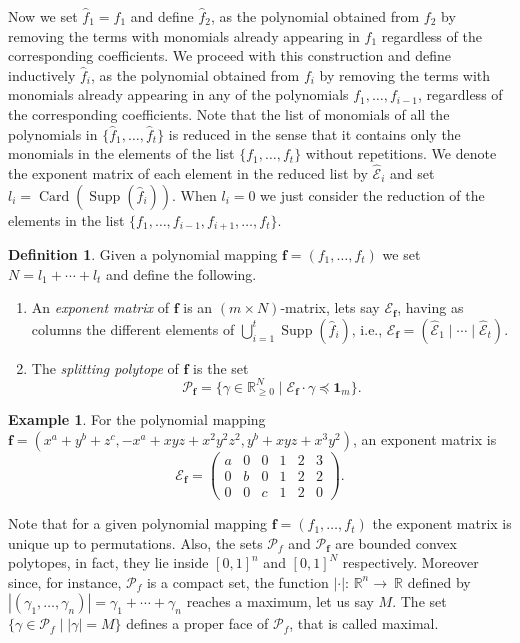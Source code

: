 \documentclass[12pt]{amsart}
\theoremstyle{definition}
\newtheorem{definition}[theorem]{Definition}
\newtheorem{example}[theorem]{Example}
\numberwithin{equation}{subsection}
\newcommand{\RR}{\mathbb{R}}
\newcommand{\SP}{\mathcal{P}}
\newcommand{\Bf}{\boldsymbol{f}}
\newcommand{\Card}{\operatorname{Card}}
\newcommand{\E}{\mathcal{E}}
\newcommand{\tE}{\operatorname{\widehat{\E}}}
\newcommand{\Supp}{\operatorname{Supp}}
\renewcommand{\!}[1]{{\color{red}\text{\Huge$\star$ }#1}}
\begin{document}
Now we set $\hat{f}_1=f_1$ and define  $\hat{f}_2$, as the polynomial obtained from $f_2$ by removing the terms with monomials already appearing in $f_1$ regardless of the corresponding coefficients. We proceed with this construction and define inductively $\hat{f}_i$, as the polynomial obtained from $f_i$ by removing the terms with monomials already appearing in any of the polynomials $f_1, \ldots, f_{i-1}$, regardless of the corresponding coefficients. Note that the list of monomials of all the polynomials in $\{\hat{f}_1, \ldots, \hat{f}_t\}$ is reduced in the sense that it contains only the monomials in the elements of the list $\{f_1, \ldots, f_t\}$ without repetitions. We denote the exponent matrix of each element in the reduced list by $\tE_i$ and set $l_i=\Card(\Supp(\hat{f}_i))$. When $l_i=0$ we just consider the reduction of the elements in the list $\{f_1,\ldots,f_{i-1},f_{i+1},\ldots, f_t\}$.
\begin{definition}\label{Def:ExpMat_SpliPol}
Given a polynomial mapping $\Bf=(f_1, \ldots, f_t)$ we set $N=l_1+\cdots+l_t$ and define the following.
\begin{enumerate}
\item An \textit{exponent matrix} of $\Bf$ is an $(m \times N)$-matrix, lets say $\E_{\Bf}$, having as columns the different elements of $\bigcup_{i=1}^t\Supp(\hat{f}_i)$, i.e., $\E_{\Bf}=(\tE_{1}\mid \cdots\mid \tE_{t})$.
\item The \textit{splitting polytope} of $\Bf$ is the set 
\[\SP_{\Bf}=\{\gamma \in \RR_{\geq 0}^{N} \mid \E_{\Bf}\cdot \gamma \preceq \textbf{1}_{m}\}.\]
\end{enumerate}
\end{definition}
\begin{example}\label{Ex:List}
	For the polynomial mapping $\Bf=(x^{a}+y^b+z^c,-x^a+xyz+x^2y^2z^2,y^b+xyz+x^3y^2)$, an exponent matrix is 
	\[\E_{\Bf}=
	\begin{pmatrix}
		a & 0 & 0 &1 & 2 & 3\\
		0 & b & 0 &1 & 2 & 2\\
		0 & 0 & c &1 & 2 & 0
	\end{pmatrix}. 
	\]
\end{example}
Note that for a given polynomial mapping $\Bf=(f_1, \ldots, f_t)$ the exponent matrix is unique up to permutations. Also, the sets $\SP_f$ and $\SP_{\Bf}$ are bounded convex polytopes, in fact, they lie inside $[0,1]^n$ and $[0,1]^N$ respectively. Moreover since, for instance,  $\SP_f$ is a compact set, the function $|\cdot|:\, \RR^n\to\ \RR$ defined by $|(\gamma_1,\ldots,\gamma_n)|=\gamma_1+\cdots+\gamma_n$ reaches a maximum, let us say $M$. The set $\{\gamma\in \SP_f \mid |\gamma|=M\}$ defines a proper face of $\SP_f$, that is called maximal.
\end{document}
